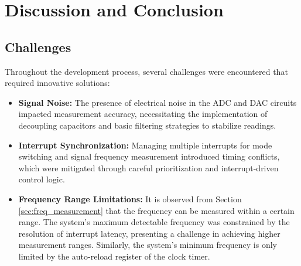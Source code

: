 \section{Discussion and Conclusion}
\subsection{Challenges}
Throughout the development process, several challenges were encountered that required innovative solutions:  
\begin{itemize}[leftmargin=2em]
    \item \textbf{Signal Noise:} The presence of electrical noise in the ADC and DAC circuits impacted measurement accuracy, necessitating the implementation of decoupling capacitors and basic filtering strategies to stabilize readings.
    \item \textbf{Interrupt Synchronization:} Managing multiple interrupts for mode switching and signal frequency measurement introduced timing conflicts, which were mitigated through careful prioritization and interrupt-driven control logic.
    \item \textbf{Frequency Range Limitations:} It is observed from Section \ref{sec:freq_measurement} that the frequency can be measured within a certain range. The system's maximum detectable frequency was constrained by the resolution of interrupt latency, presenting a challenge in achieving higher measurement ranges. Similarly, the system's minimum frequency is only limited by the auto-reload register of the clock timer.
\end{itemize}

